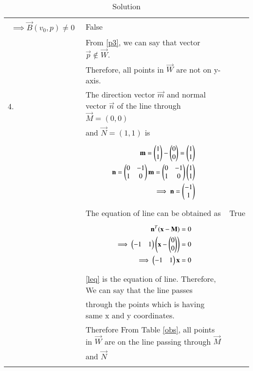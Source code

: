 \documentclass[journal,12pt]{IEEEtran}
\begin{document}
\begin{longtable}{|l|l|l|}
{\begin{align}
    \implies\vec{B}(v_0,p)\neq0\label{p3}
\end{align}}&False\\&From \eqref{p3}, we can say that vector $\vec{p}\not\in\vec{W}$.&\\&Therefore, all points in $\vec{W}$ are not on y-axis.&\\
\hline
4.&The direction vector $\vec{m}$ and normal vector $\vec{n}$ of the line through $\vec{M}=(0,0)$&\\& and $\vec{N}=(1,1)$ is&\\&\parbox{13cm}{\begin{align}
    \mathbf{m}=\begin{pmatrix}1\\1\end{pmatrix}-\begin{pmatrix}0\\0\end{pmatrix}=\begin{pmatrix}1\\1\end{pmatrix}\\
    \mathbf{n}=\begin{pmatrix}0&-1\\1&0\end{pmatrix}\mathbf{m}=\begin{pmatrix}0&-1\\1&0\end{pmatrix}\begin{pmatrix}1\\1\end{pmatrix}\\
    \implies\mathbf{n}=\begin{pmatrix}-1\\1\end{pmatrix}
\end{align}}&\\&The equation of line can be obtained as&True\\&\parbox{13cm}{\begin{align}
    \mathbf{n}^T(\mathbf{x}-\mathbf{M})=0\\
    \implies\begin{pmatrix}-1&1\end{pmatrix}\left(\mathbf{x}-\begin{pmatrix}0\\0\end{pmatrix}\right)=0\\
    \implies\begin{pmatrix}-1&1\end{pmatrix}\mathbf{x}=0\label{leq}
\end{align}}&\\&\eqref{leq} is the equation of line. Therefore, We can say that the line passes&\\& through the points which is having same x and y coordinates.&\\&Therefore From Table \ref{obs}, all points in $\vec{W}$ are on the line passing through $\vec{M}$&\\& and $\vec{N}$&\\
\hline
\caption{Solution}
\label{sol}
\end{longtable}
\end{document}
